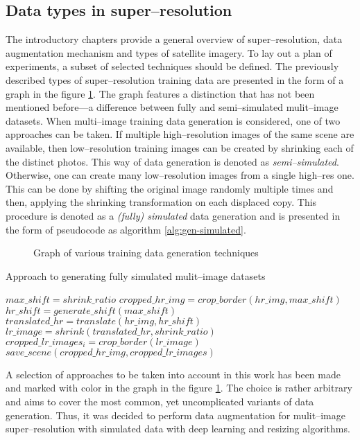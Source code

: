 \subsection{Data types in super--resolution}
The introductory chapters provide a general overview of super--resolution, data augmentation mechanism and types of satellite imagery.
To lay out a plan of experiments, a subset of selected techniques should be defined.
The previously described types of super--resolution training data are presented in the form of a graph in the figure \ref{fig:image-types}.
The graph features a distinction that has not been mentioned before---a difference between fully and semi--simulated mulit--image datasets.
When multi--image training data generation is considered, one of two approaches can be taken.
If multiple high--resolution images of the same scene are available, then low--resolution training images can be created by shrinking each of the distinct photos.
This way of data generation is denoted as \textit{semi--simulated}.
Otherwise, one can create many low--resolution images from a single high--res one.
This can be done by shifting the original image randomly multiple times and then, applying the shrinking transformation on each displaced copy.
This procedure is denoted as a \textit{(fully) simulated} data generation and is presented in the form of pseudocode as algorithm \ref{alg:gen-simulated}.
\begin{figure}
	\centering
    
    \caption{Graph of various training data generation techniques}
    \label{fig:image-types}
\end{figure}
\begin{algorithm}
\caption{Approach to generating fully simulated mulit--image datasets}
\label{alg:gen-simulated}
\begin{algorithmic}
	\STATE $ max\_shift = shrink\_ratio $
		\STATE $ cropped\_hr\_img = crop\_border(hr\_img, max\_shift) $
			\STATE $ hr\_shift = generate\_shift(max\_shift) $
			\STATE $ translated\_hr = translate(hr\_img, hr\_shift) $
			\STATE $ lr\_image = shrink(translated\_hr, shrink\_ratio) $
			\STATE $ cropped\_lr\_images_{i} = crop\_border(lr\_image) $
		\ENDFOR
		\STATE $ save\_scene(cropped\_hr\_img, cropped\_lr\_images) $
	\ENDFOR
\end{algorithmic}
\end{algorithm}

A selection of approaches to be taken into account in this work has been made and marked with color in the graph in the figure \ref{fig:image-types}.
The choice is rather arbitrary and aims to cover the most common, yet uncomplicated variants of data generation.
Thus, it was decided to perform data augmentation for mulit--image super--resolution with simulated data with deep learning and resizing algorithms.

